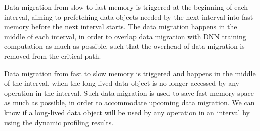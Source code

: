 Data migration from slow to fast memory is triggered at the beginning of each interval, aiming to prefetching data objects needed by the next interval into fast memory before the next interval starts. The data migration happens in the middle of each interval, in order to overlap data migration with DNN training computation as much as possible, such that the overhead of data migration is removed from the critical path. 

Data migration from fast to slow memory is triggered and happens in the middle of the interval, when the long-lived data object is \textcolor{check}{no longer accessed by any operation in the interval}. Such data migration is used to save fast memory space as much as possible, in order to accommodate upcoming data migration. \textcolor{check}{We can know if a long-lived data object will be used by any operation in an interval by using the dynamic profiling results.}

